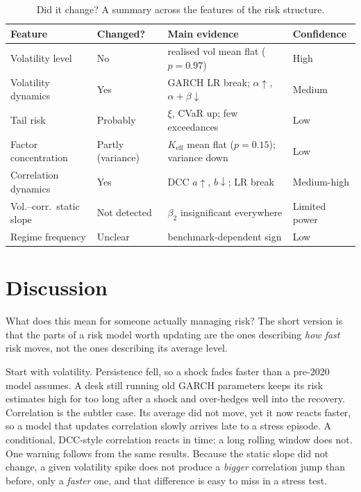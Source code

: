 \documentclass[11pt,a4paper]{article}
\newcommand{\Keff}{K_{\text{eff}}}
\begin{document}
\begin{table}[H]
\centering
\caption{Did it change? A summary across the features of the risk structure.}
\label{tab:synth}
\small
\begin{tabular}{llll}
\toprule
Feature & Changed? & Main evidence & Confidence \\
\midrule
Volatility level        & No                    & realised vol mean flat ($p=0.97$)        & High \\
Volatility dynamics     & Yes                   & GARCH LR break; $\alpha\!\uparrow$, $\alpha+\beta\!\downarrow$ & Medium \\
Tail risk               & Probably              & $\xi$, CVaR up; few exceedances          & Low \\
Factor concentration    & Partly (variance)     & $\Keff$ mean flat ($p=0.15$); variance down & Low \\
Correlation dynamics    & Yes                   & DCC $a\!\uparrow$, $b\!\downarrow$; LR break & Medium-high \\
Vol.--corr.\ static slope & Not detected        & $\beta_2$ insignificant everywhere       & Limited power \\
Regime frequency        & Unclear               & benchmark-dependent sign                 & Low \\
\bottomrule
\end{tabular}
\end{table}

% 
\section{Discussion}
% 

What does this mean for someone actually managing risk? The short version is that the parts of a risk
model worth updating are the ones describing \emph{how fast} risk moves, not the ones describing its
average level.

Start with volatility. Persistence fell, so a shock fades faster than a pre-2020 model assumes. A desk
still running old GARCH parameters keeps its risk estimates high for too long after a shock and
over-hedges well into the recovery. Correlation is the subtler case. Its average did not move, yet it now
reacts faster, so a model that updates correlation slowly arrives late to a stress episode. A conditional,
DCC-style correlation reacts in time; a long rolling window does not. One warning follows from the same
results. Because the static slope did not change, a given volatility spike does not produce a
\emph{bigger} correlation jump than before, only a \emph{faster} one, and that difference is easy to miss
in a stress test.
\end{document}
